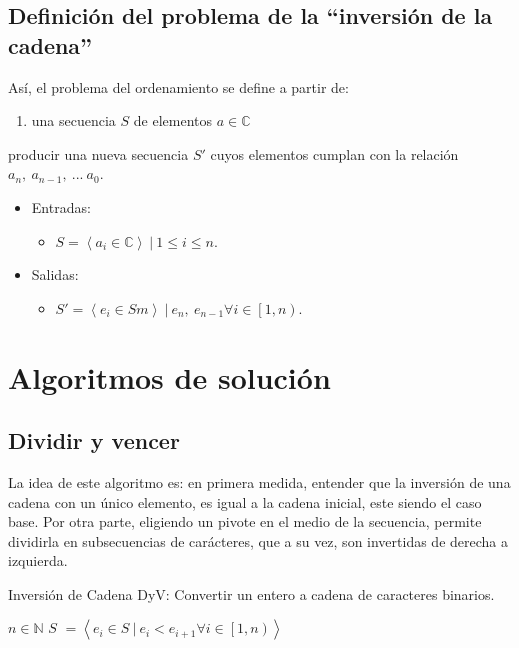 \documentclass[letter]{article}
\begin{document}
\subsection{Definición del problema de la ``inversión de la cadena''} \label{problema}
Así, el problema del ordenamiento se define a partir de:
  \begin{enumerate}
    \item una secuencia $S$ de elementos $a\in \mathbb{C}$
  \end{enumerate}
producir una nueva secuencia $S'$ cuyos elementos cumplan con la relación $a_n,~ a_{n-1},~ ...~ a_0$.
\begin{itemize}
    \item Entradas:
    \begin{itemize}
        \item $S = \left< a_i \in \mathbb{C} \right> ~ | ~ 1\le i \le n$.
    \end{itemize}
    \item Salidas:
    \begin{itemize}
        \item $S' = \left< e_i \in S m\right> ~ | ~ e_n,~ e_{n-1} \forall i \in \left[1,n\right)$.
    \end{itemize}
\end{itemize}

\section{Algoritmos de solución} \label{algoritmos}
\subsection{Dividir y vencer} \label{algoritmos:dyv}
La idea de este algoritmo es: en primera medida, entender que la inversión de una cadena con un único elemento, es igual a la cadena inicial, este siendo el caso base. Por otra parte,
eligiendo un pivote en el medio de la secuencia, permite dividirla en subsecuencias de carácteres, que a su vez, son invertidas de derecha a izquierda.

\newpage

\begin{algorithm}[!htb]
\caption{Inversión de Cadena DyV: Convertir un entero a cadena de caracteres binarios.}
\begin{algorithmic}[1]
\Require $n \in \mathbb{N} $
\Ensure $S$  $= \left< e_i \in S  ~ | ~ e_i < e_{i+1} \forall i \in \left[1,n\right)\right>$
        \State {}
      \EndIf
    \EndFor
  \EndFor
\EndProcedure
\end{algorithmic}
\end{algorithm}
\end{document}
